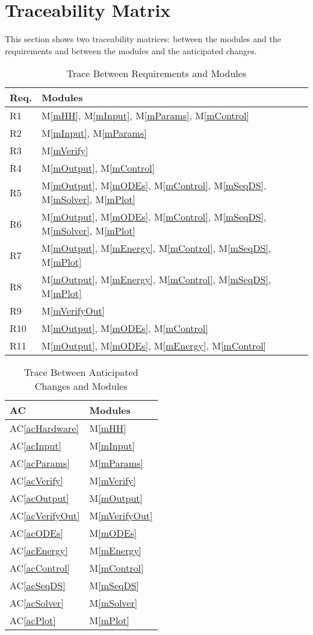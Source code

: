 \documentclass[12pt, titlepage]{article}
\newcommand{\acref}[1]{AC\ref{#1}}
\newcommand{\mref}[1]{M\ref{#1}}
\begin{document}
\section{Traceability Matrix} \label{SecTM}
This section shows two traceability matrices: between the modules and the
requirements and between the modules and the anticipated changes.
\begin{table}[H]
\centering
\begin{tabular}{p{} p{}}
\toprule
\textbf{Req.} & \textbf{Modules}\\
\midrule
R1 & \mref{mHH}, \mref{mInput}, \mref{mParams}, \mref{mControl}\\
R2 & \mref{mInput}, \mref{mParams}\\
R3 & \mref{mVerify}\\
R4 & \mref{mOutput}, \mref{mControl}\\
R5 & \mref{mOutput}, \mref{mODEs}, \mref{mControl}, \mref{mSeqDS}, \mref{mSolver}, \mref{mPlot}\\
R6 & \mref{mOutput}, \mref{mODEs}, \mref{mControl}, \mref{mSeqDS}, \mref{mSolver}, \mref{mPlot}\\
R7 & \mref{mOutput}, \mref{mEnergy}, \mref{mControl}, \mref{mSeqDS}, \mref{mPlot}\\
R8 & \mref{mOutput}, \mref{mEnergy}, \mref{mControl}, \mref{mSeqDS}, \mref{mPlot}\\
R9 & \mref{mVerifyOut}\\
R10 & \mref{mOutput}, \mref{mODEs}, \mref{mControl}\\
R11 & \mref{mOutput}, \mref{mODEs}, \mref{mEnergy}, \mref{mControl}\\
\bottomrule
\end{tabular}
\caption{Trace Between Requirements and Modules}
\label{TblRT}
\end{table}
\begin{table}[H]
\centering
\begin{tabular}{p{} p{}}
\toprule
\textbf{AC} & \textbf{Modules}\\
\midrule
\acref{acHardware} & \mref{mHH}\\
\acref{acInput} & \mref{mInput}\\
\acref{acParams} & \mref{mParams}\\
\acref{acVerify} & \mref{mVerify}\\
\acref{acOutput} & \mref{mOutput}\\
\acref{acVerifyOut} & \mref{mVerifyOut}\\
\acref{acODEs} & \mref{mODEs}\\
\acref{acEnergy} & \mref{mEnergy}\\
\acref{acControl} & \mref{mControl}\\
\acref{acSeqDS} & \mref{mSeqDS}\\
\acref{acSolver} & \mref{mSolver}\\
\acref{acPlot} & \mref{mPlot}\\
\bottomrule
\end{tabular}
\caption{Trace Between Anticipated Changes and Modules}
\label{TblACT}
\end{table}
\end{document}
